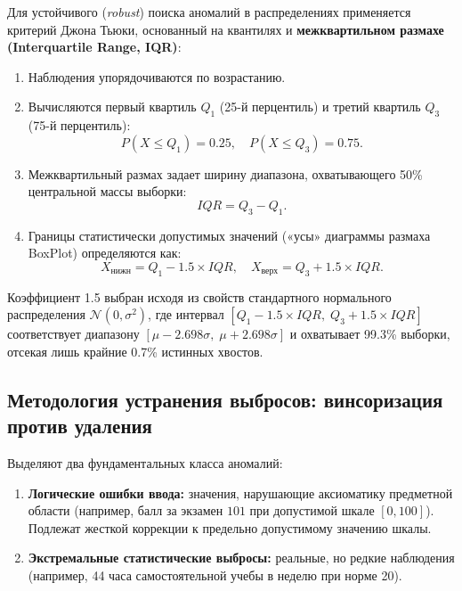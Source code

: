 \documentclass[14pt,a4paper]{extarticle}
\begin{document}
Для устойчивого (\textit{robust}) поиска аномалий в распределениях применяется критерий Джона Тьюки, основанный на квантилях и \textbf{межквартильном размахе (Interquartile Range, IQR)}:
\begin{enumerate}
    \item Наблюдения упорядочиваются по возрастанию.
    \item Вычисляются первый квартиль $Q_1$ (25-й перцентиль) и третий квартиль $Q_3$ (75-й перцентиль):
    \begin{equation}
        P(X \le Q_1) = 0.25, \quad P(X \le Q_3) = 0.75.
    \end{equation}
    \item Межквартильный размах задает ширину диапазона, охватывающего 50\% центральной массы выборки:
    \begin{equation}
        IQR = Q_3 - Q_1.
    \end{equation}
    \item Границы статистически допустимых значений («усы» диаграммы размаха BoxPlot) определяются как:
    \begin{equation}
        X_{\text{нижн}} = Q_1 - 1.5 \times IQR, \quad X_{\text{верх}} = Q_3 + 1.5 \times IQR.
    \end{equation}
\end{enumerate}

Коэффициент 1.5 выбран исходя из свойств стандартного нормального распределения $\mathcal{N}(0, \sigma^2)$, где интервал $[Q_1 - 1.5 \times IQR, \; Q_3 + 1.5 \times IQR]$ соответствует диапазону $[\mu - 2.698\sigma, \; \mu + 2.698\sigma]$ и охватывает 99.3\% выборки, отсекая лишь крайние 0.7\% истинных хвостов.

\subsection{Методология устранения выбросов: винсоризация против удаления}

Выделяют два фундаментальных класса аномалий:
\begin{enumerate}
    \item \textbf{Логические ошибки ввода:} значения, нарушающие аксиоматику предметной области (например, балл за экзамен $101$ при допустимой шкале $[0, 100]$). Подлежат жесткой коррекции к предельно допустимому значению шкалы.
    \item \textbf{Экстремальные статистические выбросы:} реальные, но редкие наблюдения (например, 44 часа самостоятельной учебы в неделю при норме 20).
\end{enumerate}
\end{document}
